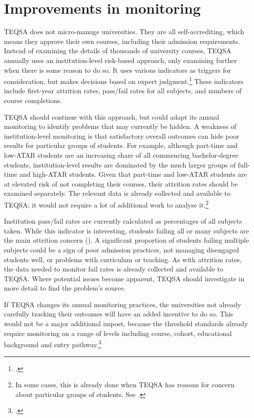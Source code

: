 \section{Improvements in monitoring}\label{sec:7.2}

TEQSA does not micro-manage universities. They are all self-accrediting, which means they approve their own courses, including their admission requirements. Instead of examining the details of thousands of university courses, TEQSA annually uses an institution-level risk-based approach, only examining further when there is some reason to do so. It uses various indicators as triggers for consideration, but makes decisions based on expert judgment.\footcite{TEQSA2016e} \CenturyFootnote
These indicators include first-year attrition rates, pass/fail rates for all subjects, and numbers of course completions.

TEQSA should continue with this approach, but could adapt its annual monitoring to identify problems that may currently be hidden. A weakness of institution-level monitoring is that satisfactory overall outcomes can hide poor results for particular groups of students. For example, although part-time and low-ATAR students are an increasing share of all commencing bachelor-degree students, institution-level results are dominated by the much larger groups of full-time and high-ATAR students. Given that part-time and low-ATAR students are at elevated risk of not completing their courses, their attrition rates should be examined separately. The relevant data is already collected and available to TEQSA; it would not require a lot of additional work to analyse it.\footnote{In some cases, this is already done when TEQSA has reasons for concern about particular groups of students. See \textcite[][]{TEQSA2017f}.}

Institution pass/fail rates are currently calculated as percentages of all subjects taken. While this indicator is interesting, students failing all or many subjects are the main attrition concern (). A significant proportion of students failing multiple subjects could be a sign of poor admission practices, not managing disengaged students well, or problems with curriculum or teaching. As with attrition rates, the data needed to monitor fail rates is already collected and available to TEQSA\@. Where potential issues become apparent, TEQSA should investigate in more detail to find the problem's source.

If TEQSA changes its annual monitoring practices, the universities not already carefully tracking their outcomes will have an added incentive to do so. This would not be a major additional impost, because the threshold standards already require monitoring on a range of levels including course, cohort, educational background and entry pathway.\footcite[][section~1.3]{DepartmentofEducationandTraining2015n}


